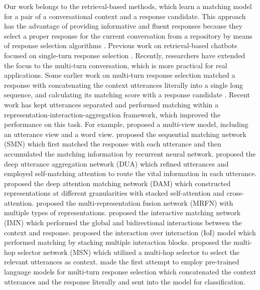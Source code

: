 \documentclass[sigconf]{acmart}
\begin{document}
  Our work belongs to the retrieval-based methods, which learn a matching model for a pair of a conversational context and a response candidate.
  This approach has the advantage of providing informative and fluent responses because they select a proper response for the current conversation from a repository by means of response selection algorithms \cite{DBLP:conf/sigdial/LowePSP15,DBLP:journals/dad/LowePSCLP17,DBLP:conf/acl/WuWXZL17,DBLP:conf/coling/ZhangLZZL18}.
  Previous work on retrieval-based chatbots focused on single-turn response selection \cite{DBLP:conf/emnlp/WangLLC13,DBLP:journals/corr/JiLL14}.
  Recently, researchers have extended the focus to the multi-turn conversation, which is more practical for real applications.
  Some earlier work on multi-turn response selection matched a response with concatenating the context utterances literally into a single long sequence, and calculating its matching score with a response candidate \cite{DBLP:conf/sigdial/LowePSP15,DBLP:journals/corr/KadlecSK15,DBLP:journals/dad/LowePSCLP17}.
  Recent work has kept utterances separated and performed matching within a representation-interaction-aggregation framework, which improved the performance on this task.
  For example, \cite{DBLP:conf/emnlp/ZhouDWZYTLY16} proposed a multi-view model, including an utterance view and a word view.
  \cite{DBLP:conf/acl/WuWXZL17} proposed the sequential matching network (SMN) which first matched the response with each utterance and then accumulated the matching information by recurrent neural network.
  \cite{DBLP:conf/coling/ZhangLZZL18} proposed the deep utterance aggregation network (DUA) which refined utterances and employed self-matching attention to route the vital information in each utterance.
  \cite{DBLP:conf/acl/WuLCZDYZL18} proposed the deep attention matching network (DAM) which constructed representations at different granularities with stacked self-attention and cross-attention.
  \cite{DBLP:conf/wsdm/TaoWXHZY19} proposed the multi-representation fusion network (MRFN) with multiple types of representations.
  \cite{DBLP:conf/cikm/GuLL19} proposed the interactive matching network (IMN) which performed the global and bidirectional interactions between the context and response.   \cite{DBLP:conf/acl/TaoWXHZY19} proposed the interaction over interaction (IoI) model which performed matching by stacking multiple interaction blocks.
  \cite{DBLP:conf/emnlp/YuanZLLZHH19} proposed the multi-hop selector network (MSN) which utilized a multi-hop selector to select the relevant utterances as context.
  \cite{DBLP:conf/acl/HendersonVGCBCS19} made the first attempt to employ pre-trained language models for multi-turn response selection which concatenated the context utterances and the response literally and sent into the model for classification.
\end{document}
